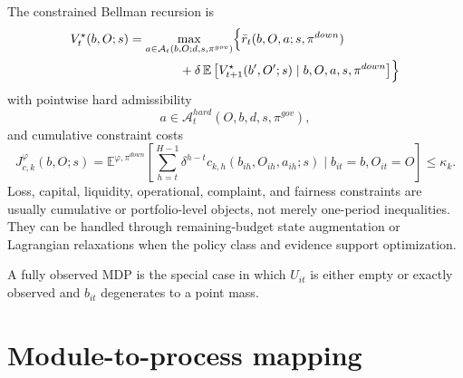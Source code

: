 \documentclass[11pt]{article}
\newcommand{\E}{\mathbb{E}}
\newcommand{\1}{\mathbf{1}}
\theoremstyle{definition}
\begin{document}
The constrained Bellman recursion is
\begin{align}
  V_t^{\star}(b,O;s)
  &=
  \max_{a\in\mathcal{A}_t(b,O;d,s,\pi^{gov})}
  \Bigl\{
    \bar r_t(b,O,a;s,\pi^{down})
    \nonumber\\
    &\qquad\qquad
    + \delta\,\E\left[V_{t+1}^{\star}(b',O';s)\mid b,O,a,s,\pi^{down}\right]
  \Bigr\}
  \label{eq:bellman-main}
\end{align}
with pointwise hard admissibility
\begin{equation}
  a\in \mathcal{A}^{hard}_{t}(O,b,d,s,\pi^{gov}),
  \label{eq:hard-feasible}
\end{equation}
and cumulative constraint costs
\begin{equation}
  J^{\varphi}_{c,k}(b,O;s)
  =
  \E^{\varphi,\pi^{down}}\!\left[
    \sum_{h=t}^{H-1}\delta^{h-t}
    c_{k,h}(b_{ih},O_{ih},a_{ih};s)
    \mid b_{it}=b,O_{it}=O
  \right]
  \le \kappa_k.
  \label{eq:cumulative-constraints}
\end{equation}
Loss, capital, liquidity, operational, complaint, and fairness constraints are
usually cumulative or portfolio-level objects, not merely one-period
inequalities. They can be handled through remaining-budget state augmentation or
Lagrangian relaxations when the policy class and evidence support optimization.

A fully observed MDP is the special case in which $U_{it}$ is either empty or
exactly observed and $b_{it}$ degenerates to a point mass.

\section{Module-to-process mapping}
\end{document}
